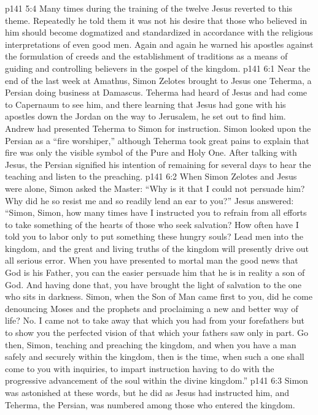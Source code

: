 \vs p141 5:4 Many times during the training of the twelve Jesus reverted to this theme. Repeatedly he told them it was not his desire that those who believed in him should become dogmatized and standardized in accordance with the religious interpretations of even good men. Again and again he warned his apostles against the formulation of creeds and the establishment of traditions as a means of guiding and controlling believers in the gospel of the kingdom.
\vs p141 6:1 Near the end of the last week at Amathus, Simon Zelotes brought to Jesus one Teherma, a Persian doing business at Damascus. Teherma had heard of Jesus and had come to Capernaum to see him, and there learning that Jesus had gone with his apostles down the Jordan on the way to Jerusalem, he set out to find him. Andrew had presented Teherma to Simon for instruction. Simon looked upon the Persian as a “fire worshiper,” although Teherma took great pains to explain that fire was only the visible symbol of the Pure and Holy One. After talking with Jesus, the Persian signified his intention of remaining for several days to hear the teaching and listen to the preaching.
\vs p141 6:2 When Simon Zelotes and Jesus were alone, Simon asked the Master: “Why is it that I could not persuade him? Why did he so resist me and so readily lend an ear to you?” Jesus answered: \textcolor{ubdarkred}{“Simon, Simon, how many times have I instructed you to refrain from all efforts to take something  of the hearts of those who seek salvation? How often have I told you to labor only to put something  these hungry souls? Lead men into the kingdom, and the great and living truths of the kingdom will presently drive out all serious error. When you have presented to mortal man the good news that God is his Father, you can the easier persuade him that he is in reality a son of God. And having done that, you have brought the light of salvation to the one who sits in darkness. Simon, when the Son of Man came first to you, did he come denouncing Moses and the prophets and proclaiming a new and better way of life? No. I came not to take away that which you had from your forefathers but to show you the perfected vision of that which your fathers saw only in part. Go then, Simon, teaching and preaching the kingdom, and when you have a man safely and securely within the kingdom, then is the time, when such a one shall come to you with inquiries, to impart instruction having to do with the progressive advancement of the soul within the divine kingdom.”}
\vs p141 6:3 Simon was astonished at these words, but he did as Jesus had instructed him, and Teherma, the Persian, was numbered among those who entered the kingdom.
